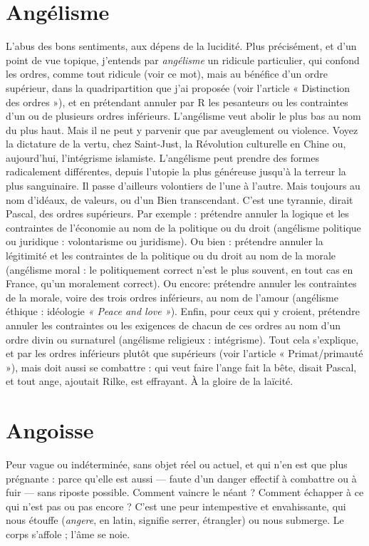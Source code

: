 \section{Angélisme}
L'abus des bons sentiments, aux dépens de la lucidité. Plus précisément,
et d’un point de vue topique, j'entends par {\it angélisme}
un ridicule particulier, qui confond les ordres, comme tout ridicule (voir ce
mot), mais au bénéfice d’un ordre supérieur, dans la quadripartition que j'ai
proposée (voir l’article « Distinction des ordres »), et en prétendant annuler par
R les pesanteurs ou les contraintes d’un ou de plusieurs ordres inférieurs.
L’angélisme veut abolir le plus bas au nom du plus haut. Mais il ne peut y parvenir
que par aveuglement ou violence. Voyez la dictature de la vertu, chez
Saint-Just, la Révolution culturelle en Chine ou, aujourd’hui, l’intégrisme islamiste.
L’angélisme peut prendre des formes radicalement différentes, depuis
l'utopie la plus généreuse jusqu’à la terreur la plus sanguinaire. Il passe
d’ailleurs volontiers de l’une à l’autre. Mais toujours au nom d’idéaux, de
valeurs, ou d’un Bien transcendant. C’est une tyrannie, dirait Pascal, des ordres
supérieurs. Par exemple : prétendre annuler la logique et les contraintes de
l’économie au nom de la politique ou du droit (angélisme politique ou
juridique : volontarisme ou juridisme). Ou bien : prétendre annuler la légitimité
et les contraintes de la politique ou du droit au nom de la morale (angélisme
moral : le politiquement correct n’est le plus souvent, en tout cas en
France, qu'un moralement correct). Ou encore: prétendre annuler les
contraintes de la morale, voire des trois ordres inférieurs, au nom de l'amour
(angélisme éthique : idéologie {\it « Peace and love »}). Enfin, pour ceux qui y
croient, prétendre annuler les contraintes ou les exigences de chacun de ces
ordres au nom d’un ordre divin ou surnaturel (angélisme religieux : intégrisme).
Tout cela s'explique, et par les ordres inférieurs plutôt que supérieurs
(voir l’article « Primat/primauté »), mais doit aussi se combattre : qui veut faire
l’ange fait la bête, disait Pascal, et tout ange, ajoutait Rilke, est effrayant. À la
gloire de la laïcité.

\section{Angoisse}
Peur vague ou indéterminée, sans objet réel ou actuel, et qui n’en
est que plus prégnante : parce qu’elle est aussi — faute d’un
danger effectif à combattre ou à fuir — sans riposte possible. Comment vaincre
le néant ? Comment échapper à ce qui n’est pas ou pas encore ? C’est une peur
intempestive et envahissante, qui nous étouffe ({\it angere}, en latin, signifie serrer,
étrangler) ou nous submerge. Le corps s’affole ; l’âme se noie.

